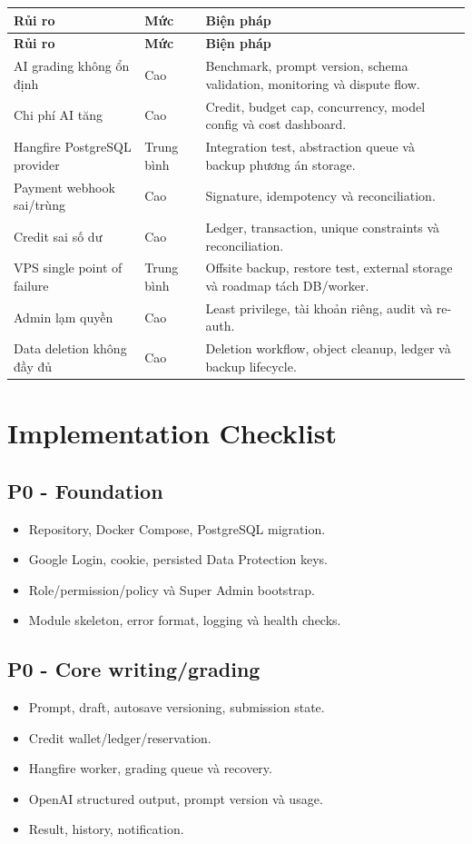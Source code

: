 \documentclass[11pt,a4paper]{article}
\begin{document}
\begin{longtable}{|P{0.25\textwidth}|P{0.15\textwidth}|P{0.50\textwidth}|}
\hline
\textbf{Rủi ro} & \textbf{Mức} & \textbf{Biện pháp} \\ \hline
\endfirsthead
\hline
\textbf{Rủi ro} & \textbf{Mức} & \textbf{Biện pháp} \\ \hline
\endhead
AI grading không ổn định & Cao & Benchmark, prompt version, schema validation, monitoring và dispute flow. \\ \hline
Chi phí AI tăng & Cao & Credit, budget cap, concurrency, model config và cost dashboard. \\ \hline
Hangfire PostgreSQL provider & Trung bình & Integration test, abstraction queue và backup phương án storage. \\ \hline
Payment webhook sai/trùng & Cao & Signature, idempotency và reconciliation. \\ \hline
Credit sai số dư & Cao & Ledger, transaction, unique constraints và reconciliation. \\ \hline
VPS single point of failure & Trung bình & Offsite backup, restore test, external storage và roadmap tách DB/worker. \\ \hline
Admin lạm quyền & Cao & Least privilege, tài khoản riêng, audit và re-auth. \\ \hline
Data deletion không đầy đủ & Cao & Deletion workflow, object cleanup, ledger và backup lifecycle. \\ \hline
\end{longtable}

\section{Implementation Checklist}

\subsection{P0 - Foundation}
\begin{itemize}
  \item Repository, Docker Compose, PostgreSQL migration.
  \item Google Login, cookie, persisted Data Protection keys.
  \item Role/permission/policy và Super Admin bootstrap.
  \item Module skeleton, error format, logging và health checks.
\end{itemize}

\subsection{P0 - Core writing/grading}
\begin{itemize}
  \item Prompt, draft, autosave versioning, submission state.
  \item Credit wallet/ledger/reservation.
  \item Hangfire worker, grading queue và recovery.
  \item OpenAI structured output, prompt version và usage.
  \item Result, history, notification.
\end{itemize}
\end{document}
